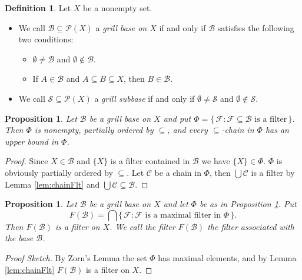 \documentclass[12pt]{article}
\theoremstyle{plain}
\newtheorem{prop}[thm]{Proposition}
\theoremstyle{definition}
\newtheorem{defn}[thm]{Definition}
\newcommand{\calB}{\mathcal{B}}
\newcommand{\calC}{\mathcal{C}}
\newcommand{\calF}{\mathcal{F}}
\newcommand{\calP}{\mathcal{P}}
\newcommand{\calS}{\mathcal{S}}
\begin{document}
\begin{defn}
  Let $X$ be a nonempty set.
  \begin{itemize}
    \item[(b)] We call $\calB \subseteq \calP(X)$ a \textsl{grill base on $X$} if and only if $\calB$     satisfies the following two conditions:
      \begin{itemize}
        \item[(1)] $\emptyset \ne \calB$ and $\emptyset \not\in \calB$.

        \item[(2)] If $A \in \calB$ and $A \subseteq B \subseteq X$, then $B \in \calB$.
      \end{itemize}

    \item[(c)] We call $\calS \subseteq \calP(X)$ a \textsl{grill subbase} if and only if $\emptyset \ne \calS$ and $\emptyset \not\in \calS$. 
  \end{itemize}
\end{defn}

\begin{prop}
  \label{prop:grlBasePhi}
  Let $\calB$ be a grill base on $X$ and put $\Phi = \{\, \calF : \mbox{$\calF \subseteq \calB$ is a filter} \,\}$.
  Then $\Phi$ is nonempty, partially ordered by $\subseteq$, and every \mbox{$\subseteq$-chain} in $\Phi$ has an upper bound in $\Phi$.
\end{prop}
\begin{proof}
  Since $X \in \calB$ and $\{X\}$ is a filter contained in $\calB$ we have $\{X\} \in \Phi$.
  $\Phi$ is obviously partially ordered by $\subseteq$.
  Let $\calC$ be a chain in $\Phi$, then $\bigcup\calC$ is a filter by Lemma \ref{lem:chainFlt} and $\bigcup\calC \subseteq \calB$.
\end{proof}

\begin{prop}
  Let $\calB$ be a grill base on $X$ and let $\Phi$ be as in Proposition \ref{prop:grlBasePhi}.
  Put 
  \[
    F(\calB) = \bigcap\{\, \calF : \mbox{$\calF$ is a maximal filter in $\Phi$} \,\}.
  \]
  Then $F(\calB)$ is a filter on $X$.
  We call the filter $F(\calB)$ the \textsl{filter associated with the base $\calB$}.
\end{prop}
\begin{proof}[Proof Sketch]
  By Zorn's Lemma the set $\Phi$ has maximal elements, and by Lemma \ref{lem:chainFlt} $F(\calB)$ is a filter on $X$.
\end{proof}
\end{document}
